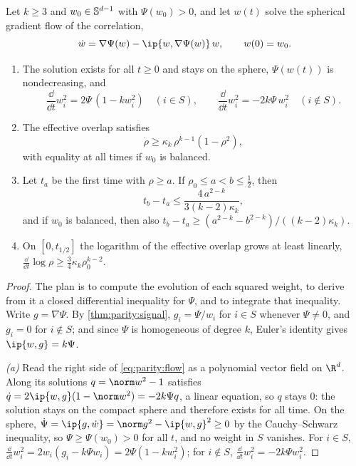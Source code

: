 \begin{refsection}
\begin{theorem}\label{thm:parity:hidden}
Let $k\ge3$ and $w_0\in\mathbb{S}^{d-1}$ with $\Psi(w_0)>0$, and let $w(t)$ solve the spherical gradient flow of the correlation,
\begin{equation}\label{eq:parity:flow}
  \dot w=\nabla\Psi(w)-\ip{w,\nabla\Psi(w)}\,w,\qquad w(0)=w_0 .
\end{equation}
\begin{enumerate}
\item[\textup{(a)}] The solution exists for all $t\ge0$ and stays on the sphere, $\Psi(w(t))$ is nondecreasing, and
\[
  \frac{\dd}{\dd t}w_i^2=2\Psi\,(1-kw_i^2)\quad(i\in S),\qquad\frac{\dd}{\dd t}w_i^2=-2k\Psi\,w_i^2\quad(i\notin S).
\]
\item[\textup{(b)}] The effective overlap satisfies
\begin{equation}\label{eq:parity:rhoineq}
  \dot\rho\ge\kappa_k\,\rho^{k-1}(1-\rho^2),
\end{equation}
with equality at all times if $w_0$ is balanced.
\item[\textup{(c)}] Let $t_a$ be the first time with $\rho\ge a$. If $\rho_0\le a<b\le\frac12$, then
\[
  t_b-t_a\le\frac{4\,a^{2-k}}{3(k-2)\kappa_k},
\]
and if $w_0$ is balanced, then also $t_b-t_a\ge(a^{2-k}-b^{2-k})/((k-2)\kappa_k)$.
\item[\textup{(d)}] On $[0,t_{1/2}]$ the logarithm of the effective overlap grows at least linearly, $\frac{\dd}{\dd t}\log\rho\ge\frac34\kappa_k\rho_0^{k-2}$.
\end{enumerate}
\end{theorem}

\begin{proof}
The plan is to compute the evolution of each squared weight, to derive from it a closed differential inequality for $\Psi$, and to integrate that inequality. Write $g=\nabla\Psi$. By \cref{thm:parity:signal}, $g_i=\Psi/w_i$ for $i\in S$ whenever $\Psi\ne0$, and $g_i=0$ for $i\notin S$; and since $\Psi$ is homogeneous of degree $k$, Euler's identity gives $\ip{w,g}=k\Psi$.

\emph{(a)} Read the right side of \eqref{eq:parity:flow} as a polynomial vector field on $\R^d$. Along its solutions $q=\norm w^2-1$ satisfies $\dot q=2\ip{w,g}(1-\norm w^2)=-2k\Psi q$, a linear equation, so $q$ stays $0$: the solution stays on the compact sphere and therefore exists for all time. On the sphere, $\dot\Psi=\ip{g,\dot w}=\norm g^2-\ip{w,g}^2\ge0$ by the Cauchy--Schwarz inequality, so $\Psi\ge\Psi(w_0)>0$ for all $t$, and no weight in $S$ vanishes. For $i\in S$, $\frac{\dd}{\dd t}w_i^2=2w_i(g_i-k\Psi w_i)=2\Psi(1-kw_i^2)$; for $i\notin S$, $\frac{\dd}{\dd t}w_i^2=-2k\Psi w_i^2$.


\end{proof}
\end{refsection}
